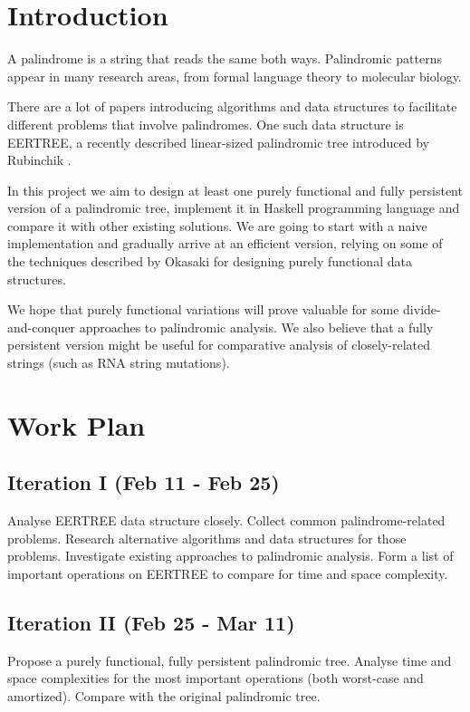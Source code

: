 \section{Introduction}

A palindrome is a string that reads the same both ways.
Palindromic patterns appear in many research areas, from
formal language theory to molecular biology.

There are a lot of papers introducing algorithms and data structures
to facilitate different problems that involve palindromes.
One such data structure is EERTREE, a recently described
linear-sized palindromic tree introduced by Rubinchik \cite{RUBINCHIK2018249}.

In this project we aim to design at least one purely functional and
fully persistent version of a palindromic tree, implement it
in Haskell programming language and compare it
with other existing solutions. We are going to start with
a naive implementation and gradually arrive at an efficient
version, relying on some of the techniques described by
Okasaki \cite{Okasaki1998} for designing purely functional data structures.

We hope that purely functional variations will prove valuable
for some divide-and-conquer approaches to palindromic analysis.
We also believe that a fully persistent version might be useful
for comparative analysis of closely-related strings
(such as RNA string mutations).

\section{Work Plan}

\subsection{Iteration I (Feb 11 - Feb 25)}

Analyse EERTREE data structure closely.
Collect common palindrome-related problems.
Research alternative algorithms and data structures for those problems.
Investigate existing approaches to palindromic analysis.
Form a list of important operations on EERTREE
to compare for time and space complexity.

\subsection{Iteration II (Feb 25 - Mar 11)}

Propose a purely functional, fully persistent palindromic tree.
Analyse time and space complexities for the most important operations
(both worst-case and amortized).
Compare with the original palindromic tree.

